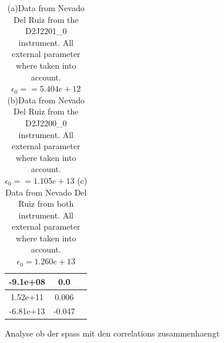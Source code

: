 \documentclass  [
  paper    = a4,
  BCOR     = 10mm,
  twoside,
  fontsize = 12pt,
  fleqn,
  toc      = bibnumbered,
  toc      = listofnumbered,
  numbers  = noendperiod,
  headings = normal,
  listof   = leveldown,
  version  = 3.03
]                                       {scrreprt}
\begin{document}
\begin{table}
{\begin{tabular}{c|c|c}
			\midrule
			-9.1e+08& 0.0\\
			\midrule
			 1.52e+11&0.006\\
			\midrule
			 -6.81e+13& -0.047\\
			\bottomrule
	\end{tabular}}
	\caption{(a)Data from Nevado Del Ruiz from the D2J2201\_0 instrument. All external parameter where taken into account. $\epsilon_{0} = =  5.404e+12$
			(b)Data from Nevado Del Ruiz from the D2J2200\_0 instrument. All external parameter where taken into account. $\epsilon_{0} = =  1.105e+13$ (c) Data from Nevado Del Ruiz from both instrument. All external parameter where taken into account. $\epsilon_{0} = 1.260e+13$}
		\label{tab:coefNevad}
	\end{table}	
	\begin{table}
		\caption{(a)Data from Tungurahua  from the instrument. All external parameter where taken into account. $\epsilon_{0} = =  5.404e+12$
			(b)Data from Tungurahua from the  instrument. All external parameter where taken into account. $\epsilon_{0} = =  1.105e+13$ (c) Data from Tungurahua from all instrument. All external parameter where taken into account. $\epsilon_{0} = 1.260e+13$}
		\label{tab:coefTung}
	\end{table}			
	Analyse ob der spass mit den correlations zusammenhaengt
\end{document}
